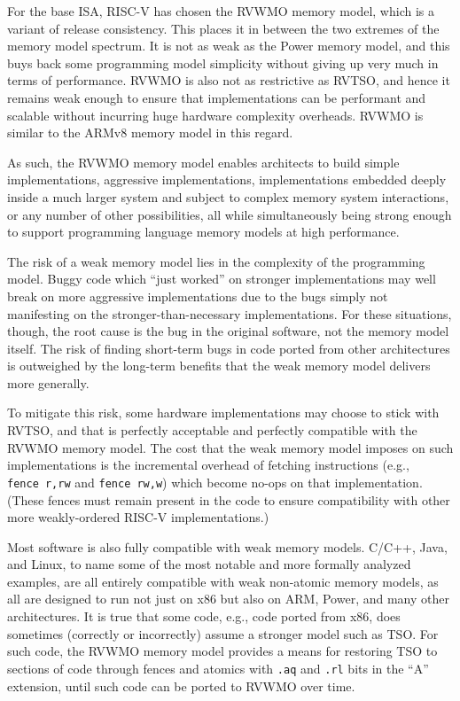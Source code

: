 For the base ISA, RISC-V has chosen the RVWMO memory model, which is a variant of release consistency.
This places it in between the two extremes of the memory model spectrum.
It is not as weak as the Power memory model, and this buys back some programming model simplicity without giving up very much in terms of performance.
RVWMO is also not as restrictive as RVTSO, and hence it remains weak enough to ensure that implementations can be performant and scalable without incurring huge hardware complexity overheads.
RVWMO is similar to the ARMv8 memory model in this regard.

As such, the RVWMO memory model enables architects to build simple implementations, aggressive implementations, implementations embedded deeply inside a much larger system and subject to complex memory system interactions, or any number of other possibilities, all while simultaneously being strong enough to support programming language memory models at high performance.

The risk of a weak memory model lies in the complexity of the programming model.
Buggy code which ``just worked'' on stronger implementations may well break on more aggressive implementations due to the bugs simply not manifesting on the stronger-than-necessary implementations.
For these situations, though, the root cause is the bug in the original software, not the memory model itself.
The risk of finding short-term bugs in code ported from other architectures is outweighed by the long-term benefits that the weak memory model delivers more generally.

To mitigate this risk, some hardware implementations may choose to stick with RVTSO, and that is perfectly acceptable and perfectly compatible with the RVWMO memory model.
The cost that the weak memory model imposes on such implementations is the incremental overhead of fetching instructions (e.g., {\tt fence~r,rw} and {\tt fence rw,w}) which become no-ops on that implementation.
(These fences must remain present in the code to ensure compatibility with other more weakly-ordered RISC-V implementations.)

Most software is also fully compatible with weak memory models.
C/C++, Java, and Linux, to name some of the most notable and more formally analyzed examples, are all entirely compatible with weak non-atomic memory models, as all are designed to run not just on x86 but also on ARM, Power, and many other architectures.
It is true that some code, e.g., code ported from x86, does sometimes (correctly or incorrectly) assume a stronger model such as TSO.
For such code, the RVWMO memory model provides a means for restoring TSO to sections of code through fences and atomics with {\tt .aq} and {\tt .rl} bits in the ``A'' extension, until such code can be ported to RVWMO over time.

